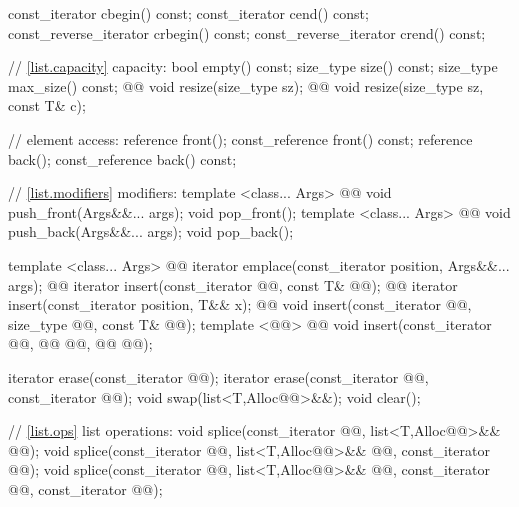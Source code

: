 \documentclass[american,twoside]{book}
\begin{document}
\begin{codeblock}
{{    const_iterator         cbegin() const;
    const_iterator         cend() const;
    const_reverse_iterator crbegin() const;
    const_reverse_iterator crend() const;

    // \ref{list.capacity} capacity:
    bool      empty() const;
    size_type size() const;
    size_type max_size() const;
    @@ void resize(size_type sz);
    @@ void resize(size_type sz, const T& c);

    // element access:
    reference       front();
    const_reference front() const;
    reference       back();
    const_reference back() const;

    // \ref{list.modifiers} modifiers:
    template <class... Args> 
      @@
      void push_front(Args&&... args);
    void pop_front();
    template <class... Args> 
      @@
      void push_back(Args&&... args);
    void pop_back();

    template <class... Args> 
      @@
      iterator emplace(const_iterator position, Args&&... args);
    @@ 
      iterator insert(const_iterator @@, const T& @@);
    @@ 
      iterator insert(const_iterator position, T&& x);
    @@ 
      void insert(const_iterator @@, size_type @@, const T& @@);
    template <@@>
      @@
      void insert(const_iterator @@, @@ @@,
                  @@ @@);

    iterator erase(const_iterator @@);
    iterator erase(const_iterator @@, const_iterator @@);
    void     swap(list<T,Alloc@@>&&);
    void     clear();

    // \ref{list.ops} list operations:
    void splice(const_iterator @@, list<T,Alloc@@>&& @@);
    void splice(const_iterator @@, list<T,Alloc@@>&& @@, const_iterator @@);
    void splice(const_iterator @@, list<T,Alloc@@>&& @@,
                const_iterator @@, const_iterator @@);

}}
\end{codeblock}
\end{document}
